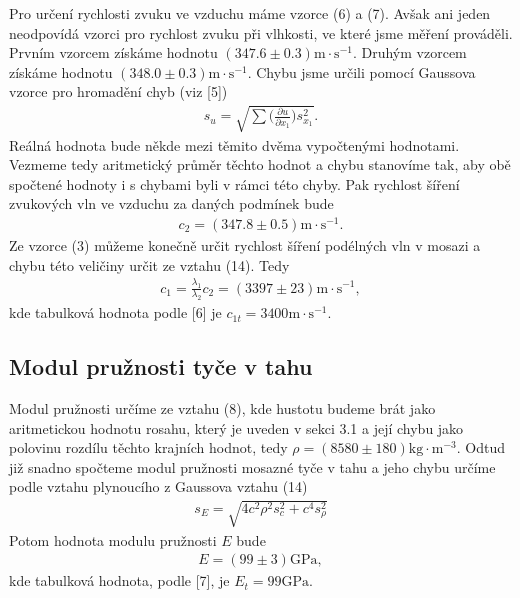 Pro určení rychlosti zvuku ve vzduchu máme vzorce (6) a (7). Avšak ani jeden neodpovídá vzorci pro rychlost zvuku při vlhkosti, ve které jsme měření prováděli. Prvním vzorcem získáme hodnotu $(347.6 \pm 0.3) \mathrm{m \cdot s^{-1}}$. Druhým vzorcem získáme hodnotu $(348.0 \pm 0.3) \mathrm{m \cdot s^{-1}}$. Chybu jsme určili pomocí Gaussova vzorce pro hromadění chyb (viz [5])
\begin{align}
    s_u = \sqrt{\sum \bigg( \frac{\partial u }{\partial x_1} \bigg) s^2_{x_1}}.
\end{align}
Reálná hodnota bude někde mezi těmito dvěma vypočtenými hodnotami. Vezmeme tedy aritmetický průměr těchto hodnot a chybu stanovíme tak, aby obě spočtené hodnoty i s chybami byli v rámci této chyby. Pak rychlost šíření zvukových vln ve vzduchu za daných podmínek bude
\begin{align*}
    c_2 = (347.8 \pm 0.5)\mathrm{m \cdot s^{-1}}.
\end{align*}
Ze vzorce (3) můžeme konečně určit rychlost šíření podélných vln v mosazi a chybu této veličiny určit ze vztahu (14). Tedy
\begin{align*}
    c_1 = \frac{\lambda_1}{\lambda_2}c_2 = (3 397 \pm 23)\mathrm{m \cdot s^{-1}},
\end{align*}
kde tabulková hodnota podle [6] je $c_{1t} = 3 400 \mathrm{m \cdot s^{-1}}$.
\subsection{Modul pružnosti tyče v tahu}
\par Modul pružnosti určíme ze vztahu (8), kde hustotu budeme brát jako aritmetickou hodnotu rosahu, který je uveden v sekci 3.1 a její chybu jako polovinu rozdílu těchto krajních hodnot, tedy $\rho = (8 580 \pm 180)\mathrm{kg \cdot m^{-3}}$. Odtud již snadno spočteme modul pružnosti mosazné tyče v tahu a jeho chybu určíme podle vztahu plynoucího z Gaussova vztahu (14)
\begin{align}
    s_E = \sqrt{4c^2 \rho^2 s^2_c + c^4 s^2_{\rho}}
\end{align}
Potom hodnota modulu pružnosti $E$ bude
\begin{align*}
    E = (99 \pm 3)\mathrm{GPa},
\end{align*}
kde tabulková hodnota, podle [7], je $E_t = 99 \mathrm{ GPa}$.
